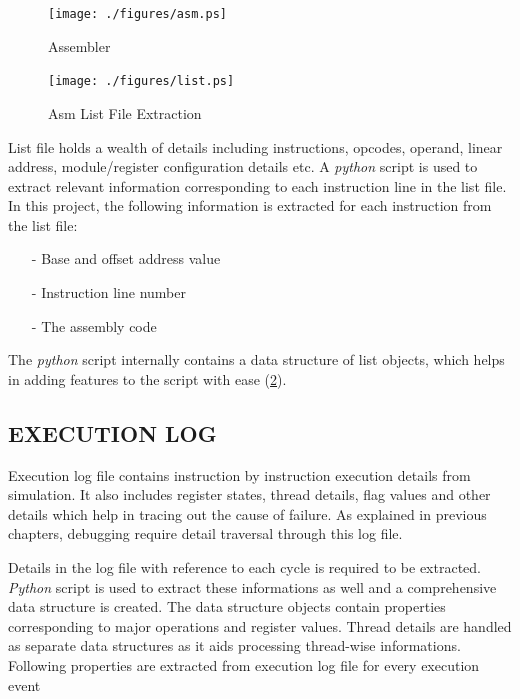 
\begin{figure}[h]
\centering
\texttt{[image: ./figures/asm.ps]}
\caption{Assembler}
\label{impl.tex:assembler}
\end{figure}


\begin{figure}[h]
\centering
\texttt{[image: ./figures/list.ps]}
\caption{Asm List File Extraction}
\label{impl.tex:listextr}
\end{figure}

List file holds a wealth of details including instructions, opcodes, operand, linear address, module/register configuration details etc. A {\it python} script is used to extract relevant information corresponding to each instruction line in the list file. In this project, the following information is extracted for each instruction from the  list file:
\begin{itemize}
	\item[-] Base and offset address value
	\item[-] Instruction line number
	\item[-] The assembly code
\end{itemize}

The {\it python} script internally contains a data structure of list objects, which helps in adding features to the script with ease (\figurename{\ref{impl.tex:listextr}}). 

\subsection {EXECUTION LOG}
Execution log file contains instruction by instruction execution details from simulation. It also includes register states, thread details, flag values and other details which help in tracing out the cause of failure. As explained in previous chapters, debugging require detail traversal through this log file. 

Details in the log file with reference to each cycle is required to be extracted. {\it Python} script is used to extract these informations as well and a comprehensive data structure is created. The data structure objects contain properties corresponding to major operations and register values. Thread details are handled as separate data structures as it aids processing thread-wise informations. Following properties are extracted from execution log file for every execution event

